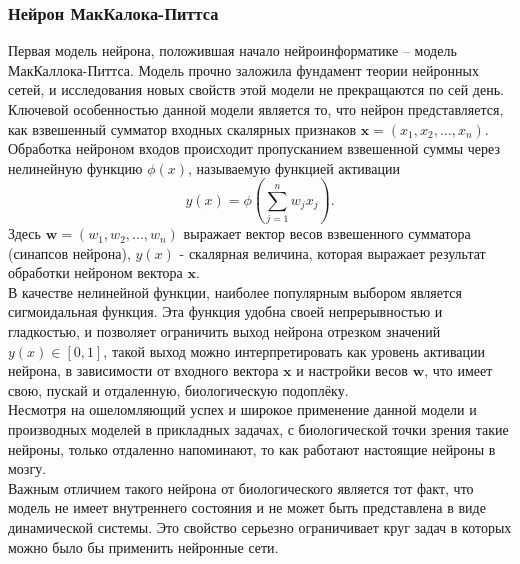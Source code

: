 \documentclass[a4paper,10pt]{article}
\begin{document}
\subsubsection{Нейрон МакКалока-Питтса}
   Первая модель нейрона, положившая начало нейроинформатике -- модель МакКаллока-Питтса. Модель прочно заложила фундамент теории нейронных сетей, и исследования новых свойств этой модели не прекращаются по сей день.\\
   \indent Ключевой особенностью данной модели является то, что нейрон представляется, как взвешенный сумматор входных скалярных признаков $\boldsymbol{x}=(x_{1},x_{2},...,x_{n})$. Обработка нейроном входов происходит пропусканием взвешенной суммы через нелинейную функцию $\phi(x)$, называемую функцией активации\\
   \begin{equation}\label{eq:sum_mp}
   y(x) = \phi(\sum_{j=1}^{n}w_{j}x_{j}).
   \end{equation}
\indent Здесь $\boldsymbol{w}=(w_{1}, w_{2},...,w_{n})$ выражает вектор весов взвешенного сумматора (синапсов нейрона), $y(x)$ - скалярная величина, которая выражает результат обработки нейроном вектора $\boldsymbol{x}$.\\	
	\indent В качестве нелинейной функции, наиболее популярным выбором является сигмоидальная функция\cite{Zaencev1999}. Эта функция удобна своей непрерывностью и гладкостью, и позволяет ограничить выход нейрона  отрезком значений $y(x)\in[0,1]$, такой выход можно интерпретировать как уровень активации нейрона, в зависимости от входного вектора $\boldsymbol{x}$ и настройки весов $\boldsymbol{w}$, что имеет свою, пускай и отдаленную, биологическую подоплёку. \\
   \indent Несмотря на ошеломляющий успех и широкое применение данной модели  и производных моделей в прикладных задачах, с биологической точки зрения такие нейроны, только отдаленно напоминают, то как работают настоящие нейроны в мозгу.\\
   \indent Важным отличием такого нейрона от биологического является тот факт, что модель не имеет внутреннего состояния и не может быть представлена в виде динамической системы\cite{Zaencev1999}. Это свойство серьезно ограничивает круг задач в которых можно было бы применить нейронные сети. 
\end{document}
